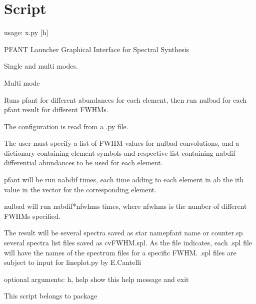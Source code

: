 \documentclass[letterpaper,10pt,english]{sphinxmanual}
\begin{document}
\section{Script }
\label{\detokenize{autoscripts/script-x::doc}}\label{\detokenize{autoscripts/script-x:script-x-py}}
\begin{sphinxVerbatim}[commandchars=\\\{\}]
usage: x.py [\PYGZhy{}h]

PFANT Launcher \PYGZhy{}\PYGZhy{} Graphical Interface for Spectral Synthesis

Single and multi modes.

Multi mode
\PYGZhy{}\PYGZhy{}\PYGZhy{}\PYGZhy{}\PYGZhy{}\PYGZhy{}\PYGZhy{}\PYGZhy{}\PYGZhy{}\PYGZhy{}

Runs pfant for different abundances for each element, then run nulbad for each
pfant result for different FWHMs.

The configuration is read from a .py file.

The user must specify a list of FWHM values for nulbad convolutions, and
a dictionary containing element symbols and respective list containing n\PYGZus{}abdif
differential abundances to be used for each element.

pfant will be run n\PYGZus{}abdif times, each time adding to each element in ab the i\PYGZhy{}th
value in the vector for the corresponding element.

nulbad will run n\PYGZus{}abdif*n\PYGZus{}fwhms times, where n\PYGZus{}fwhms is the number of different
FWHMs specified.

The result will be
\PYGZhy{} several spectra saved as  \PYGZdq{}\PYGZlt{}star name\PYGZgt{}\PYGZlt{}pfant name or counter\PYGZgt{}.sp\PYGZdq{}
\PYGZhy{} several \PYGZdq{}spectra list\PYGZdq{} files saved as \PYGZdq{}cv\PYGZus{}\PYGZlt{}FWHM\PYGZgt{}.spl\PYGZdq{}. As the file indicates,
  each \PYGZdq{}.spl\PYGZdq{} file will have the names of the spectrum files for a specific FWHM.
  .spl files are subject to input for lineplot.py by E.Cantelli
\PYGZhy{}\PYGZhy{}\PYGZhy{}\PYGZhy{}\PYGZhy{}\PYGZhy{}\PYGZhy{}\PYGZhy{}\PYGZhy{}

optional arguments:
  \PYGZhy{}h, \PYGZhy{}\PYGZhy{}help  show this help message and exit
\end{sphinxVerbatim}

This script belongs to package 



\renewcommand{\indexname}{Index}
\printindex
\end{document}

